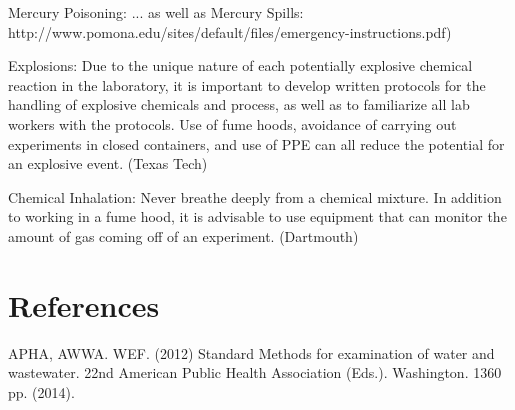 \documentclass[12pt]{../SOP4_alpha}\usepackage[]{graphicx}\usepackage[]{color}
\begin{document}
\NP Mercury Poisoning: ... as well as Mercury Spills: http://www.pomona.edu/sites/default/files/emergency-instructions.pdf)

\NP Explosions: Due to the unique nature of each potentially explosive chemical reaction in the laboratory, it is important to develop written protocols for the handling of explosive chemicals and process, as well as to familiarize all lab workers with the protocols.  Use of fume hoods, avoidance of carrying out experiments in closed containers, and use of PPE can all reduce the potential for an explosive event.  (Texas Tech)

\NP Chemical Inhalation: Never breathe deeply from a chemical mixture.  In addition to working in a fume hood, it is advisable to use equipment that can monitor the amount of gas coming off of an experiment. (Dartmouth)


\section{References}

\NP APHA, AWWA. WEF. (2012) Standard Methods for examination of water and wastewater. 22nd American Public Health Association (Eds.). Washington. 1360 pp. (2014).
\end{document}
